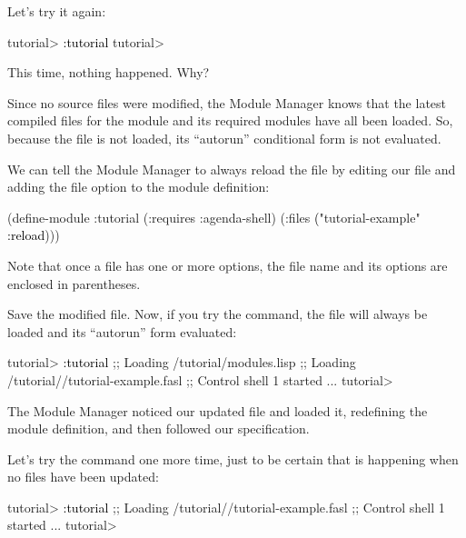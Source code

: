 \documentclass[10pt,twoside,english,pdftex]{article}
\begin{document}
Let's try it again:
%
\W\supp
\begin{smallexample}
\textcolor{darkergray}{%
  tutorial> \textcolor{black}{:tutorial}
  tutorial>}
\end{smallexample}
%
This time, nothing happened.  Why?

Since no source files were modified, the Module Manager knows that the latest
compiled files for the  module and its required modules have
all been loaded.  So, because the  file is not
loaded, its ``autorun'' conditional form is not evaluated.

We can tell the Module Manager to always reload the
 file by editing our 
file and adding the  file option to the  module
definition:
%
\W\supp
\begin{example}
\textcolor{darkergray}{%
  (define-module :tutorial
    (:requires :agenda-shell)
    (:files \textcolor{black}{(}"tutorial-example" \textcolor{black}{:reload})))}
\end{example}
%
Note that once a file has one or more options, the file name and its options
are enclosed in parentheses.

Save the modified  file. Now, if you try the
 command, the  file will always
be loaded and its ``autorun'' form evaluated:
%
\W\supp
\begin{smallexample}
\textcolor{darkergray}{%
  tutorial> \textcolor{black}{:tutorial}
  ;; Loading /tutorial/modules.lisp
  ;; Loading /tutorial//tutorial-example.fasl
  ;; Control shell 1 started
     ...
  tutorial>}
\end{smallexample}
%
The Module Manager noticed our updated  file and
loaded it, redefining the  module definition, and then
followed our  specification.

Let's try the  command one more time, just to be certain that
 is happening when no files have been updated:
%
\W\supp
\begin{smallexample}
\textcolor{darkergray}{%
  tutorial> \textcolor{black}{:tutorial}
  ;; Loading /tutorial//tutorial-example.fasl
  ;; Control shell 1 started
     ...
  tutorial>}
\end{smallexample}
\end{document}
